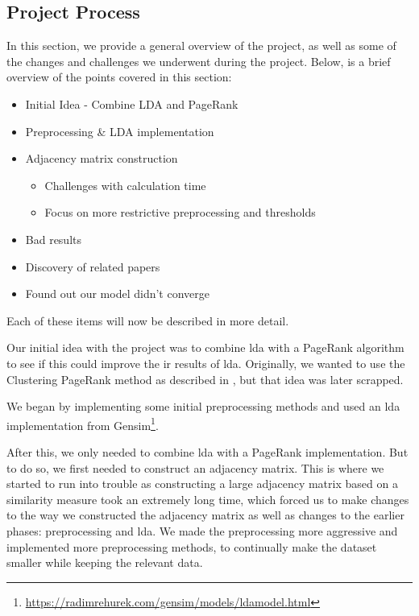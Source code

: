 \subsection{Project Process}
In this section, we provide a general overview of the project, as well as some of the changes and challenges we underwent during the project.
Below, is a brief overview of the points covered in this section:

\begin{itemize}
	\item Initial Idea - Combine LDA and PageRank
	\item Preprocessing \& LDA implementation
	\item Adjacency matrix construction
	\begin{itemize}
		\item Challenges with calculation time
		\item Focus on more restrictive preprocessing and thresholds
	\end{itemize}
	\item Bad results
	\item Discovery of related papers
	\item Found out our model didn't converge
\end{itemize}

Each of these items will now be described in more detail.

Our initial idea with the project was to combine \gls{lda} with a PageRank algorithm to see if this could improve the \acrlong{ir} results of \gls{lda}.
Originally, we wanted to use the Clustering PageRank method as described in \citeauthor{ClusterPageRank}\cite{ClusterPageRank}, but that idea was later scrapped.

We began by implementing some initial preprocessing methods and used an \gls{lda} implementation from Gensim\footnote{\url{https://radimrehurek.com/gensim/models/ldamodel.html}}.

After this, we only needed to combine \gls{lda} with a PageRank implementation. 
But to do so, we first needed to construct an adjacency matrix.
This is where we started to run into trouble as constructing a large adjacency matrix based on a similarity measure took an extremely long time, which forced us to make changes to the way we constructed the adjacency matrix as well as changes to the earlier phases: preprocessing and \gls{lda}.
We made the preprocessing more aggressive and implemented more preprocessing methods, to continually make the dataset smaller while keeping the relevant data.

